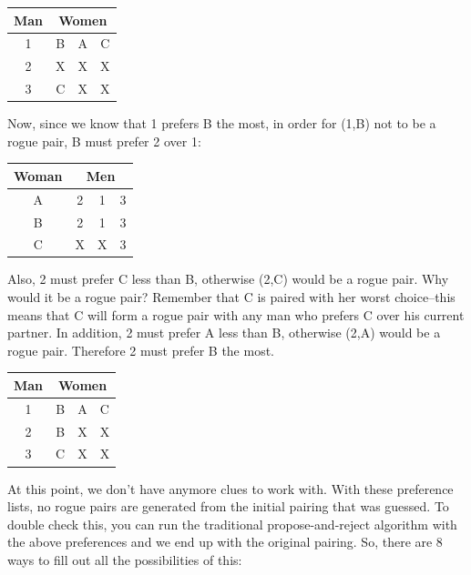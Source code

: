 \documentclass[11pt]{article}
\begin{document}
\begin{qunlist}
\begin{itemize}
{\begin{center}
\begin{tabular}{|c|ccc|}\hline 
Man&\multicolumn{3}{|c|}{Women}\\\hline 
1&B&A&C\\\hline 
2&X&X&X\\\hline 
3&C&X&X\\\hline
\end{tabular} 
\end{center}

Now, since we know that 1 prefers B the most, in order for (1,B) not to be a rogue pair, 
B must prefer 2 over 1:

\begin{center}
\begin{tabular}{|c|ccc|}\hline 
Woman&\multicolumn{3}{|c|}{Men}\\\hline 
A&2&1&3\\\hline 
B&2&1&3\\\hline 
C&X&X&3\\\hline
\end{tabular}
\end{center}

Also, 2 must prefer C less than B, otherwise (2,C) would be a rogue pair. Why would it be a rogue pair? Remember that C is paired with her worst choice--this means that C will form a rogue pair with any man who prefers C over his current partner.
In addition, 2 must prefer A less than B, otherwise (2,A) would be a rogue pair. 
Therefore 2 must prefer B the most.

\begin{center}
\begin{tabular}{|c|ccc|}\hline 
Man&\multicolumn{3}{|c|}{Women}\\\hline 
1&B&A&C\\\hline 
2&B&X&X\\\hline 
3&C&X&X\\\hline
\end{tabular} 
\end{center}

At this point, we don't have anymore clues to work with. 
With these preference lists, 
no rogue pairs are generated from the initial pairing that was guessed. 
To double check this, you can run the traditional propose-and-reject algorithm 
with the above preferences and we end up with the original pairing. 
So, there are 8 ways to fill out all the possibilities of this:


}
\end{itemize}
\end{qunlist}
\end{document}

